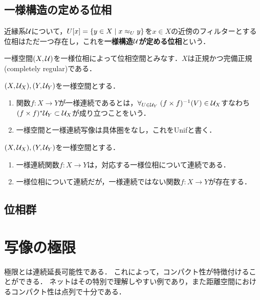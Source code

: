 \documentclass[uplatex,dvipdfmx]{jsreport}
\begin{document}
\subsection{一様構造の定める位相}


\begin{definition}
    近縁系$\mathcal{U}$について，$U[x]=\left\{y\in X\mid x\approx_Uy\right\}$を$x\in X$の近傍のフィルターとする位相はただ一つ存在し，これを\textbf{一様構造$\mathcal{U}$が定める位相}という．
\end{definition}

\begin{proposition}
    一様空間$(X,\mathcal{U})$を一様位相によって位相空間とみなす．$X$は正規かつ完備正規(completely regular)である．
\end{proposition}

\begin{definition}
    $(X,\mathcal{U}_X),(Y,\mathcal{U}_Y)$を一様空間とする．
    \begin{enumerate}
        \item 関数$f:X\to Y$が一様連続であるとは，$\forall_{U\in\mathcal{U}_Y}\;(f\times f)^{-1}(V)\in\mathcal{U}_X$すなわち$(f\times f)^*\mathcal{U}_Y\subset\mathcal{U}_X$が成り立つことをいう．
        \item 一様空間と一様連続写像は具体圏をなし，これをUnifと書く．
    \end{enumerate}
\end{definition}

\begin{lemma}
    $(X,\mathcal{U}_X),(Y,\mathcal{U}_Y)$を一様空間とする．
    \begin{enumerate}
        \item 一様連続関数$f:X\to Y$は，対応する一様位相について連続である．
        \item 一様位相について連続だが，一様連続ではない関数$f:X\to Y$が存在する．
    \end{enumerate}
\end{lemma}

\subsection{位相群}

\section{写像の極限}

\begin{tcolorbox}[colframe=ForestGreen, colback=ForestGreen!10!white,breakable,colbacktitle=ForestGreen!40!white,coltitle=black,fonttitle=\bfseries\sffamily,
title=]
    極限とは連続延長可能性である．
    これによって，コンパクト性が特徴付けることができる．
    ネットはその特別で理解しやすい例であり，また距離空間におけるコンパクト性は点列で十分である．
\end{tcolorbox}
\end{document}
